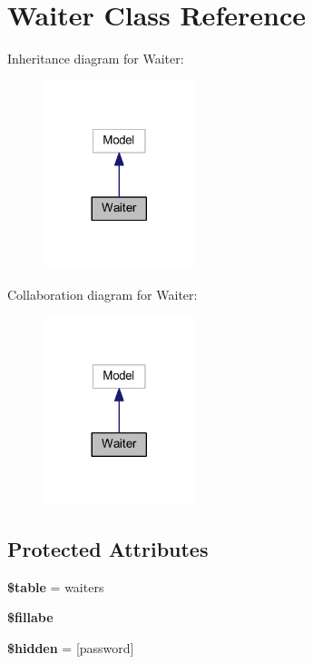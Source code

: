 \hypertarget{class_app_1_1_models_1_1_waiter}{}\section{Waiter Class Reference}
\label{class_app_1_1_models_1_1_waiter}


Inheritance diagram for Waiter\+:
\nopagebreak
\begin{figure}[H]
\begin{center}
\leavevmode
\includegraphics[width=125pt]{class_app_1_1_models_1_1_waiter__inherit__graph}
\end{center}
\end{figure}


Collaboration diagram for Waiter\+:
\nopagebreak
\begin{figure}[H]
\begin{center}
\leavevmode
\includegraphics[width=125pt]{class_app_1_1_models_1_1_waiter__coll__graph}
\end{center}
\end{figure}
\subsection*{Protected Attributes}
\begin{DoxyCompactItemize}
\item 
\mbox{\label{class_app_1_1_models_1_1_waiter_ae8876a14058f368335baccf35af4a22b}} 
{\bfseries \$table} = \textquotesingle{}waiters\textquotesingle{}
\item 
{\bfseries \$fillabe}
\item 
\mbox{\label{class_app_1_1_models_1_1_waiter_a4a374564d2858d8ae869a8fb890aad56}} 
{\bfseries \$hidden} = \mbox{[}\textquotesingle{}password\textquotesingle{}\mbox{]}
\end{DoxyCompactItemize}


